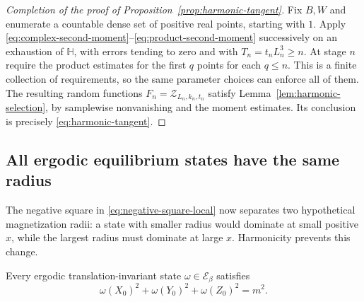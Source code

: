 \begin{proof}[Completion of the proof of Proposition~\ref{prop:harmonic-tangent}]
Fix $B,W$ and enumerate a countable dense set of positive real points,
starting with $1$.
Apply \eqref{eq:complex-second-moment}--\eqref{eq:product-second-moment}
successively on an exhaustion of $\mathbb H$, with errors tending to
zero and with $T_n=t_nL_n^3\ge n$.  At stage $n$ require the product
estimates for the first $q$ points for each $q\le n$.
This is a finite collection of requirements,
so the same parameter choices can enforce all of them.  The resulting
random functions $F_n=\mathcal Z_{L_n,k_n,t_n}$ satisfy
Lemma~\ref{lem:harmonic-selection}, by samplewise nonvanishing and the
moment estimates.  Its conclusion is precisely
\eqref{eq:harmonic-tangent}.
\end{proof}

\subsection{All ergodic equilibrium states have the same radius}

The negative square in \eqref{eq:negative-square-local} now separates
two hypothetical magnetization radii: a state with smaller radius
would dominate at small positive $x$, while the largest radius must
dominate at large $x$.  Harmonicity prevents this change.

\begin{proposition}
\label{prop:equilibrium-radius}
Every ergodic translation-invariant state $\omega\in\mathcal E_\beta$
satisfies
\begin{equation}
 \omega(X_0)^2+\omega(Y_0)^2+\omega(Z_0)^2=m^2.
 \label{eq:equilibrium-radius}
\end{equation}
\end{proposition}

